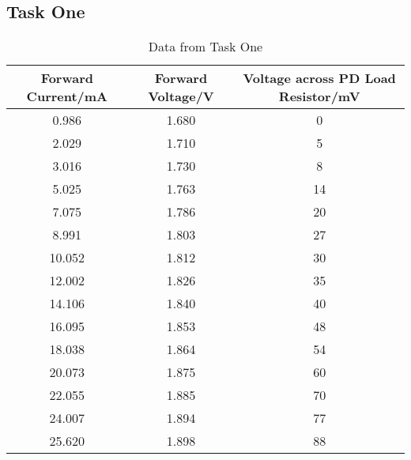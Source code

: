 \documentclass[12pt]{article}
\begin{document}
    \subsection{Task One}
    \begin{table}[H]
    \centering
    \caption{Data from Task One}
    \begin{tabular}{c c c}
    \hline
    Forward Current/mA & Forward Voltage/V &  Voltage across PD Load Resistor/mV \\
    \hline
    0.986             & 1.680             & 0                 \\
    2.029             & 1.710             & 5                 \\
    3.016             & 1.730             & 8                 \\
    5.025             & 1.763            & 14                \\
    7.075             & 1.786            & 20                \\
    8.991             & 1.803            & 27                \\
    10.052            & 1.812            & 30                \\
    12.002            & 1.826            & 35                \\
    14.106            & 1.840            & 40                \\
    16.095            & 1.853            & 48                \\
    18.038            & 1.864            & 54                \\
    20.073            & 1.875            & 60                \\
    22.055            & 1.885            & 70                \\
    24.007            & 1.894            & 77                \\
    25.620             & 1.898            & 88                \\ \hline
    \end{tabular}
    \end{table}
    
\end{document}
